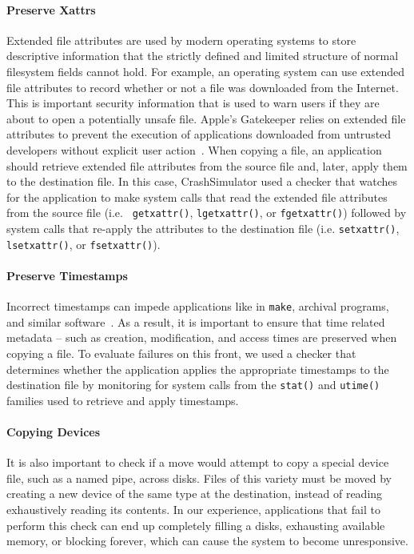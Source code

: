 \paragraph{Preserve Xattrs}

Extended file attributes
are used by modern operating systems
to store descriptive information
that the strictly defined and limited structure
of normal filesystem fields cannot hold.
For example,
an operating system can use extended file attributes
to record whether or not a file was downloaded from the Internet.
This is important security information
that is used to warn users
if they are about to open a potentially unsafe file.
Apple's Gatekeeper relies on extended file attributes
to prevent the execution of applications downloaded from
untrusted developers without explicit user action~\cite{AppleCodeSigning}.
When copying a file,
an application should retrieve extended file attributes from the source
file and, later, apply them to the destination file.
In this case, CrashSimulator used a checker
that watches for the application to make system calls
that read the extended file attributes from the source file (i.e. {\tt
  getxattr()}, {\tt lgetxattr()}, or {\tt fgetxattr()}) followed by system calls
that re-apply the attributes to the destination file (i.e. {\tt setxattr()},
{\tt lsetxattr()}, or {\tt fsetxattr()}).

\paragraph{Preserve Timestamps}

Incorrect timestamps can impede applications like
in {\tt make}, archival programs, and similar
software~\cite{NautilusTimestamps, SudoTimestamp}.
As a result, it is important to ensure
that time related metadata -- 
such as creation, modification, and access times
are preserved when copying a file.
To evaluate failures on this front,
we used a checker that determines
whether the application applies
the appropriate timestamps to the destination file
by monitoring for system calls from the {\tt stat()}
and {\tt utime()} families used to retrieve and apply timestamps.

\paragraph{Copying Devices}

It is also important to check if a move
would attempt to copy a special
device file, such as a named pipe, across disks.
Files of this variety must be moved
by creating a new device of the same type at the destination,
instead of reading exhaustively reading its contents.
In our experience, applications that fail to perform this check
can end up completely filling a disks, exhausting available memory,
or blocking forever, which can cause the system to become unresponsive.


